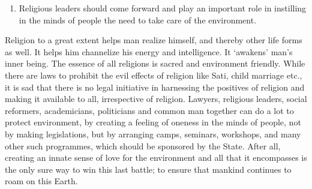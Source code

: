 \begin{multicols}{2}
\begin{enumerate}[label=$\bullet$]
\item Religious leaders should come forward and play an important role in instilling in the
minds of people the need to take care of the environment.
\end{enumerate}

\vspace{-.2cm}


\noi
Religion to a great extent helps man realize himself, and thereby other life forms as well. It
helps him channelize his energy and intelligence. It ‘awakens’ man’s inner being. The essence
of all religions is sacred and environment friendly. While there are laws to prohibit the evil
effects of religion like Sati, child marriage etc., it is sad that there is no legal initiative in
harnessing the positives of religion and making it available to all, irrespective of religion.
Lawyers, religious leaders, social reformers, academicians, politicians and common man
together can do a lot to protect environment, by creating a feeling of oneness in the minds of
people, not by making legislations, but by arranging camps, seminars, workshops, and many
other such programmes, which should be sponsored by the State. After all, creating an innate
sense of love for the environment and all that it encompasses is the only sure way to win this
last battle; to ensure that mankind continues to roam on this Earth.
\end{multicols}
	
\label{end2017-art2}
